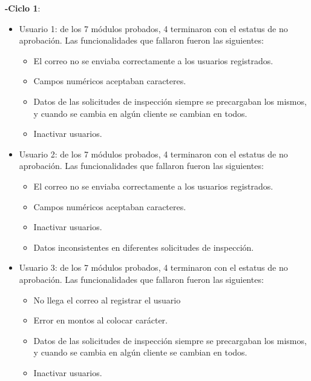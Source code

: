 \textbf{-Ciclo 1}: 
\begin{itemize}
	\item Usuario 1: de los 7 módulos probados, 4 terminaron con el estatus de no aprobación. Las funcionalidades que fallaron fueron las siguientes:
	 \begin{itemize}
			\item  El correo no se enviaba correctamente a los usuarios registrados.
			\item  Campos numéricos aceptaban caracteres.
			\item  Datos de las solicitudes de inspección siempre se precargaban los mismos, y cuando se cambia en algún cliente se cambian en todos.
			\item  Inactivar usuarios.
		  \end{itemize}

	\item Usuario 2: de los 7 módulos probados, 4 terminaron con el estatus de no aprobación. Las funcionalidades que fallaron fueron las siguientes:
	 \begin{itemize}
			\item  El correo no se enviaba correctamente a los usuarios registrados.
			\item  Campos numéricos aceptaban caracteres.
			\item  Inactivar usuarios.
			\item  Datos inconsistentes en diferentes solicitudes de inspección.
		  \end{itemize}

	\item Usuario 3: de los 7 módulos probados, 4 terminaron con el estatus de no aprobación. Las funcionalidades que fallaron fueron las siguientes:
	 \begin{itemize}
			\item  No llega el correo al registrar el usuario
			\item  Error en montos al colocar carácter.
			\item  Datos de las solicitudes de inspección siempre se precargaban los mismos, y cuando se cambia en algún cliente se cambian en todos.
			\item  Inactivar usuarios.
		  \end{itemize}

\end{itemize}

